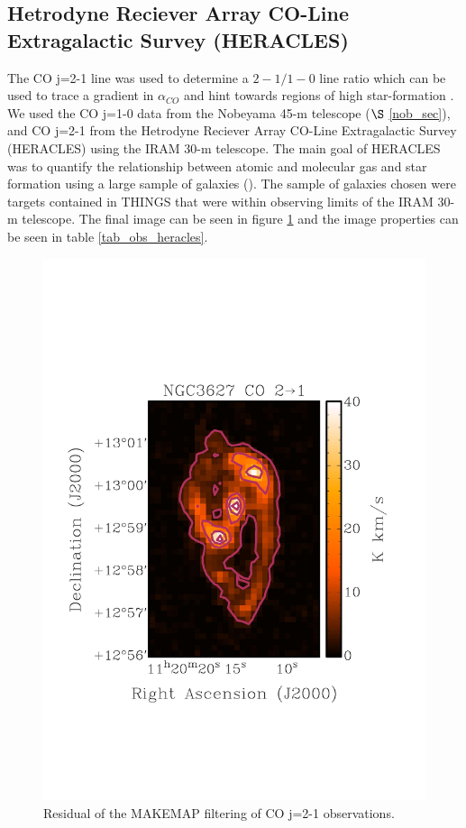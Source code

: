 \subsection{Hetrodyne Reciever Array CO-Line Extragalactic Survey (HERACLES)}

The CO j=2-1 line was used to determine a ${2-1} / {1-0}$ line ratio which can be used to trace a gradient in $\alpha_{CO}$ and hint towards regions of high star-formation \citep{reuter1996}.  We used the CO j=1-0 data from the Nobeyama 45-m telescope ($\S$ \ref{nob_sec}), and CO j=2-1 from the Hetrodyne Reciever Array CO-Line Extragalactic Survey (HERACLES) using the IRAM 30-m telescope.  The main goal of HERACLES was to quantify the relationship between atomic and molecular gas and star formation using a large sample of galaxies (\citep{leroy2009}).  The sample of galaxies chosen were targets contained in THINGS that were within observing limits of the IRAM 30-m telescope.  The final image can be seen in figure \ref{fig_co21} and the image properties can be seen in table \ref{tab_obs_heracles}.

\begin{figure}
  \centering
  \label{fig_co21}
  \includegraphics[scale=0.5]{obs_imgs/CO21.jpeg}
  \caption[NGC3627 CO j=2-1 Observations]{Residual of the MAKEMAP filtering of CO j=2-1 observations.}
\end{figure}

